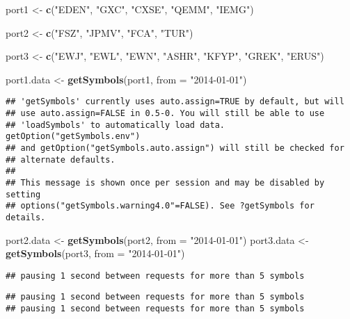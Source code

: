 \documentclass[]{article}
\newenvironment{Shaded}{\begin{snugshade}}{\end{snugshade}}
\newcommand{\DataTypeTok}[1]{\textcolor[rgb]{0.13,0.29,0.53}{#1}}
\newcommand{\KeywordTok}[1]{\textcolor[rgb]{0.13,0.29,0.53}{\textbf{#1}}}
\newcommand{\NormalTok}[1]{#1}
\newcommand{\StringTok}[1]{\textcolor[rgb]{0.31,0.60,0.02}{#1}}
\begin{document}
\begin{Shaded}
\begin{Highlighting}[]
\NormalTok{port1 <-}\StringTok{ }\KeywordTok{c}\NormalTok{(}\StringTok{"EDEN"}\NormalTok{, }\StringTok{"GXC"}\NormalTok{, }\StringTok{"CXSE"}\NormalTok{, }\StringTok{"QEMM"}\NormalTok{, }\StringTok{"IEMG"}\NormalTok{)}

\NormalTok{port2 <-}\StringTok{ }\KeywordTok{c}\NormalTok{(}\StringTok{"FSZ"}\NormalTok{, }\StringTok{"JPMV"}\NormalTok{,  }\StringTok{"FCA"}\NormalTok{, }\StringTok{"TUR"}\NormalTok{)}

\NormalTok{port3 <-}\StringTok{ }\KeywordTok{c}\NormalTok{(}\StringTok{"EWJ"}\NormalTok{, }\StringTok{"EWL"}\NormalTok{, }\StringTok{"EWN"}\NormalTok{, }\StringTok{"ASHR"}\NormalTok{, }\StringTok{"KFYP"}\NormalTok{, }\StringTok{"GREK"}\NormalTok{, }\StringTok{"ERUS"}\NormalTok{)}

\NormalTok{port1.data <-}\StringTok{ }\KeywordTok{getSymbols}\NormalTok{(port1, }\DataTypeTok{from =} \StringTok{"2014-01-01"}\NormalTok{)}
\end{Highlighting}
\end{Shaded}

\begin{verbatim}
## 'getSymbols' currently uses auto.assign=TRUE by default, but will
## use auto.assign=FALSE in 0.5-0. You will still be able to use
## 'loadSymbols' to automatically load data. getOption("getSymbols.env")
## and getOption("getSymbols.auto.assign") will still be checked for
## alternate defaults.
## 
## This message is shown once per session and may be disabled by setting 
## options("getSymbols.warning4.0"=FALSE). See ?getSymbols for details.
\end{verbatim}

\begin{Shaded}
\begin{Highlighting}[]
\NormalTok{port2.data <-}\StringTok{ }\KeywordTok{getSymbols}\NormalTok{(port2, }\DataTypeTok{from =} \StringTok{"2014-01-01"}\NormalTok{)}
\NormalTok{port3.data <-}\StringTok{ }\KeywordTok{getSymbols}\NormalTok{(port3, }\DataTypeTok{from =} \StringTok{"2014-01-01"}\NormalTok{)}
\end{Highlighting}
\end{Shaded}

\begin{verbatim}
## pausing 1 second between requests for more than 5 symbols
\end{verbatim}

\begin{verbatim}
## pausing 1 second between requests for more than 5 symbols
## pausing 1 second between requests for more than 5 symbols
\end{verbatim}
\end{document}
